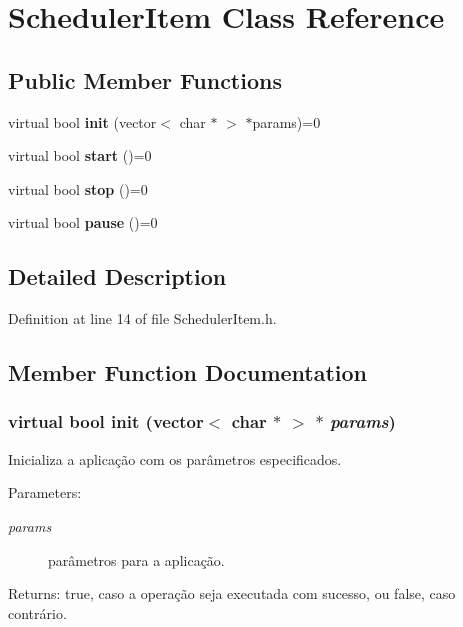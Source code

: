 \section{SchedulerItem Class Reference}
\label{classbr_1_1ufscar_1_1lince_1_1ginga_1_1recommender_1_1SchedulerItem}
\subsection*{Public Member Functions}
\begin{CompactItemize}
\item 
virtual bool {\bf init} (vector$<$ char $\ast$ $>$ $\ast$params)=0
\item 
virtual bool {\bf start} ()=0
\item 
virtual bool {\bf stop} ()=0
\item 
virtual bool {\bf pause} ()=0
\end{CompactItemize}


\subsection{Detailed Description}




Definition at line 14 of file SchedulerItem.h.

\subsection{Member Function Documentation}
\subsubsection{\setlength{\rightskip}{0pt plus 5cm}virtual bool init (vector$<$ char $\ast$ $>$ $\ast$ {\em params})\hspace{0.3cm}{\tt  [pure virtual]}}\label{classbr_1_1ufscar_1_1lince_1_1ginga_1_1recommender_1_1SchedulerItem_4d85a38a9525c83e1f52f60c65beb1f3}


Inicializa a aplicação com os parâmetros especificados. \begin{Desc}
\item[Parameters:]
\begin{description}
\item[{\em params}]parâmetros para a aplicação. \end{description}
\end{Desc}
\begin{Desc}
\item[Returns:]true, caso a operação seja executada com sucesso, ou false, caso contrário. \end{Desc}
